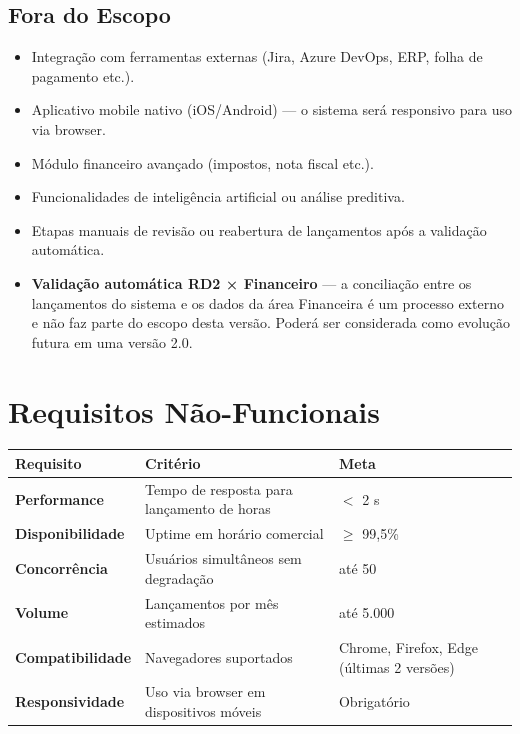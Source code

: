 \documentclass[12pt,a4paper]{article}
\begin{document}
\subsection{Fora do Escopo}

\begin{itemize}[leftmargin=1.5em]
  \item Integração com ferramentas externas (Jira, Azure DevOps, ERP, folha de pagamento etc.).
  \item Aplicativo mobile nativo (iOS/Android) — o sistema será responsivo para uso via browser.
  \item Módulo financeiro avançado (impostos, nota fiscal etc.).
  \item Funcionalidades de inteligência artificial ou análise preditiva.
  \item Etapas manuais de revisão ou reabertura de lançamentos após a validação automática.
  \item \textbf{Validação automática RD2 × Financeiro} — a conciliação entre os lançamentos
    do sistema e os dados da área Financeira é um processo externo e não faz parte do escopo
    desta versão. Poderá ser considerada como evolução futura em uma versão 2.0.
\end{itemize}

\section{Requisitos Não-Funcionais}

\begin{tabularx}{\linewidth}{>{\bfseries}l >{\raggedright\arraybackslash}X l}
  \toprule
  Requisito & Critério & Meta \\
  \midrule
  Performance      & Tempo de resposta para lançamento de horas  & $<$ 2 s \\
  Disponibilidade  & Uptime em horário comercial                 & $\geq$ 99,5\% \\
  Concorrência     & Usuários simultâneos sem degradação         & até 50 \\
  Volume           & Lançamentos por mês estimados               & até 5.000 \\
  Compatibilidade  & Navegadores suportados                      & Chrome, Firefox, Edge (últimas 2 versões) \\
  Responsividade   & Uso via browser em dispositivos móveis      & Obrigatório \\
  \bottomrule
\end{tabularx}
\end{document}
